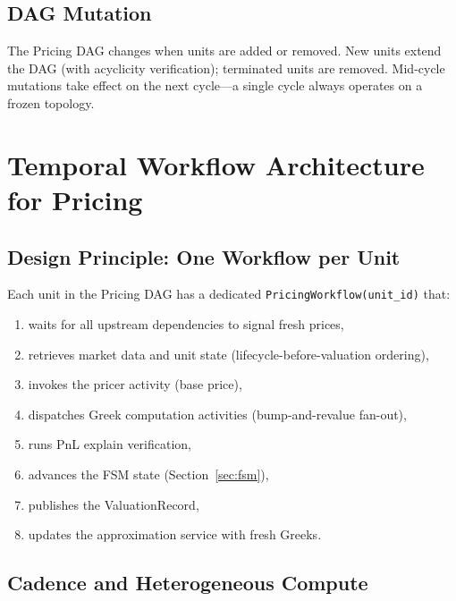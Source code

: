 \documentclass[11pt,a4paper]{article}
\begin{document}
\subsection{DAG Mutation}

The Pricing DAG changes when units are added or removed.  New units extend the DAG (with acyclicity verification); terminated units are removed.  Mid-cycle mutations take effect on the next cycle---a single cycle always operates on a frozen topology.

\clearpage
\section{Temporal Workflow Architecture for Pricing}
\label{sec:temporal}

\subsection{Design Principle: One Workflow per Unit}

Each unit in the Pricing DAG has a dedicated \texttt{PricingWorkflow(unit\_id)} that:
\begin{enumerate}[nosep]
\item waits for all upstream dependencies to signal fresh prices,
\item retrieves market data and unit state (lifecycle-before-valuation ordering),
\item invokes the pricer activity (base price),
\item dispatches Greek computation activities (bump-and-revalue fan-out),
\item runs PnL explain verification,
\item advances the FSM state (Section~\ref{sec:fsm}),
\item publishes the ValuationRecord,
\item updates the approximation service with fresh Greeks.
\end{enumerate}

\subsection{Cadence and Heterogeneous Compute}
\end{document}
